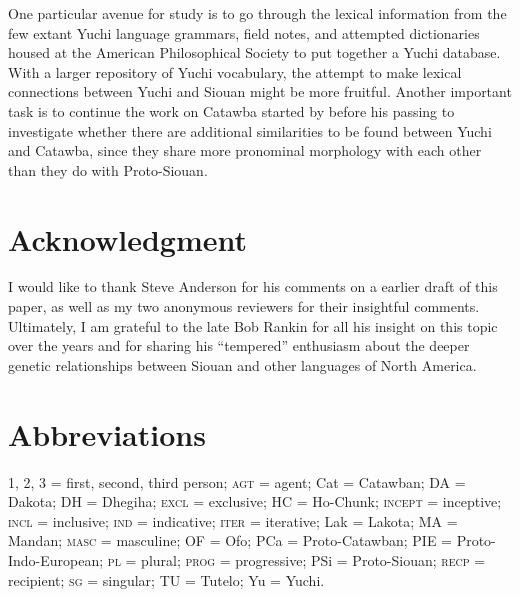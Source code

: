 \documentclass[output=paper]{LSP/langsci}
\begin{document}
One particular avenue for study is to go through the lexical information from the few extant Yuchi language grammars, field notes, and attempted dictionaries housed at the American Philosophical Society to put together a Yuchi database. With a larger repository of Yuchi vocabulary, the attempt to make lexical connections between Yuchi and Siouan might be more fruitful. Another important task is to continue the work on Catawba started by \citet{Rudes2007} before his passing to investigate whether there are additional similarities to be found between Yuchi and Catawba, since they share more pronominal morphology with each other than they do with Proto-Siouan.

\section*{Acknowledgment}

I would like to thank Steve Anderson for his comments on a earlier draft of this paper, as well as my two anonymous reviewers for their insightful comments. Ultimately, I am grateful to the late Bob Rankin for all his insight on this topic over the years and for sharing his ``tempered'' enthusiasm about the deeper genetic relationships between Siouan and other languages of North America.

\section*{Abbreviations}
1, 2, 3 = first, second, third person; \textsc{agt} = agent; Cat = Catawban; DA = Dakota; DH = Dhegiha; \textsc{excl} = exclusive; HC = Ho-Chunk; \textsc{incept} = inceptive; \textsc{incl} = inclusive; \textsc{ind} = indicative; \textsc{iter} = iterative; Lak = Lakota; MA = Mandan; \textsc{masc} = masculine; OF = Ofo; PCa = Proto-Catawban; PIE = Proto-Indo-European; \textsc{pl} = plural; \textsc{prog} = progressive; PSi = Proto-Siouan; \textsc{recp} = recipient; \textsc{sg} = singular; TU = Tutelo; Yu = Yuchi.


\nocite{CrawfordNotebooks,Crawford1979}

\printbibliography[heading=subbibliography,notkeyword=this]
 
\end{document}
